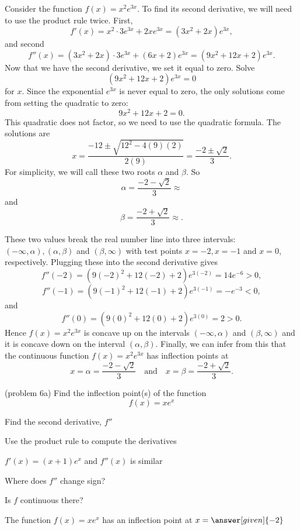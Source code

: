 \documentclass{ximera}
\begin{document}
\begin{example}[example 6]
Consider the function $f(x) = x^2e^{3x}$.  To find its second derivative, 
we will need to use the product rule twice. First, 
\[f'(x) = x^2 \cdot 3e^{3x} + 2xe^{3x} = (3x^2 + 2x)e^{3x},\]
and second
\[f''(x) = (3x^2 + 2x)\cdot 3e^{3x} + (6x + 2)e^{3x} = (9x^2 + 12x + 2)e^{3x}.\]
Now that we have the second derivative, we set it equal to zero.  Solve
\[(9x^2 + 12x + 2)e^{3x}=0\]
for $x$.
Since the exponential $e^{3x}$ is never equal to zero, the only solutions come from setting the quadratic to zero:
\[9x^2 + 12x + 2=0.\]
This quadratic does not factor, so we need to use the quadratic formula.
The solutions are 
\[x = \frac{-12 \pm \sqrt{12^2 - 4(9)(2)}}{2(9)} = \frac{-2 \pm \sqrt{2}}{3}.\]
For simplicity, we will call these two roots $\alpha$ and $\beta$.
So 
\[\alpha = \frac{-2 - \sqrt{2}}{3} \approx \]
and
\[\beta = \frac{-2 + \sqrt{2}}{3} \approx .\]

These two values break the real number line into three intervals: $(-\infty, \alpha), 
(\alpha, \beta)$ and $(\beta, \infty)$ with test points
$x = -2, x = -1$ and $x = 0$, respectively.
Plugging these into the second derivative gives
\[f''(-2) = (9(-2)^2 + 12(-2) + 2)e^{3(-2)} = 14e^{-6} > 0,\]
\[f''(-1) = (9(-1)^2 + 12(-1) + 2)e^{3(-1)} = -e^{-3} < 0,\]
and
\[f''(0) = (9(0)^2 + 12(0) + 2)e^{3(0)} = 2 > 0.\]
Hence $f(x) = x^2 e^{3x}$ is concave up on the intervals $(-\infty, \alpha)$ 
and $(\beta, \infty)$ and it is concave down on the interval 
$(\alpha, \beta)$.
Finally, we can infer from this that the continuous function $f(x) = x^2 e^{3x}$ has inflection points at 
\[
x = \alpha= \dfrac{-2 - \sqrt{2}}{3} \quad \text{and} \quad x = \beta = \dfrac{-2 + \sqrt{2}}{3}.
\]
\end{example}

\begin{problem}(problem 6a)
  Find the inflection point(s) of the function
  \[
     f(x) = xe^x
  \]
  
    \begin{hint}
      Find the second derivative, $f''$
    \end{hint}
    \begin{hint}
      Use the product rule to compute the derivatives
    \end{hint}
		\begin{hint}
      $f'(x) = (x+1)e^x$ and $f''(x)$ is similar
    \end{hint}
		\begin{hint}
      Where does $f''$ change sign?
    \end{hint}
    \begin{hint}
      Is $f$ continuous there?
    \end{hint}  
		The function $f(x) = xe^x$ has an inflection 
		point at $x =\answer[given]{-2}$
		
\end{problem}
\end{document}
